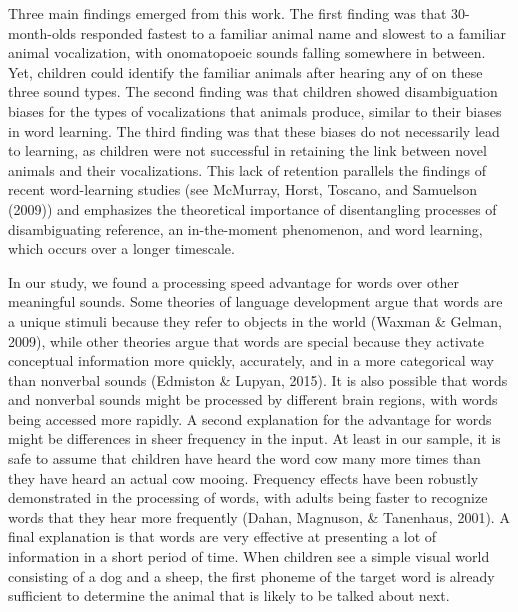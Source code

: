 \documentclass[english,floatsintext,man]{apa6}
\theoremstyle{definition}
\theoremstyle{definition}
\theoremstyle{definition}
\theoremstyle{remark}
\begin{document}
Three main findings emerged from this work. The first finding was that
30-month-olds responded fastest to a familiar animal name and slowest to
a familiar animal vocalization, with onomatopoeic sounds falling
somewhere in between. Yet, children could identify the familiar animals
after hearing any of on these three sound types. The second finding was
that children showed disambiguation biases for the types of
vocalizations that animals produce, similar to their biases in word
learning. The third finding was that these biases do not necessarily
lead to learning, as children were not successful in retaining the link
between novel animals and their vocalizations. This lack of retention
parallels the findings of recent word-learning studies (see McMurray,
Horst, Toscano, and Samuelson (2009)) and emphasizes the theoretical
importance of disentangling processes of disambiguating reference, an
in-the-moment phenomenon, and word learning, which occurs over a longer
timescale.

In our study, we found a processing speed advantage for words over other
meaningful sounds. Some theories of language development argue that
words are a unique stimuli because they refer to objects in the world
(Waxman \& Gelman, 2009), while other theories argue that words are
special because they activate conceptual information more quickly,
accurately, and in a more categorical way than nonverbal sounds
(Edmiston \& Lupyan, 2015). It is also possible that words and nonverbal
sounds might be processed by different brain regions, with words being
accessed more rapidly. A second explanation for the advantage for words
might be differences in sheer frequency in the input. At least in our
sample, it is safe to assume that children have heard the word cow many
more times than they have heard an actual cow mooing. Frequency effects
have been robustly demonstrated in the processing of words, with adults
being faster to recognize words that they hear more frequently (Dahan,
Magnuson, \& Tanenhaus, 2001). A final explanation is that words are
very effective at presenting a lot of information in a short period of
time. When children see a simple visual world consisting of a dog and a
sheep, the first phoneme of the target word is already sufficient to
determine the animal that is likely to be talked about next.
\end{document}
